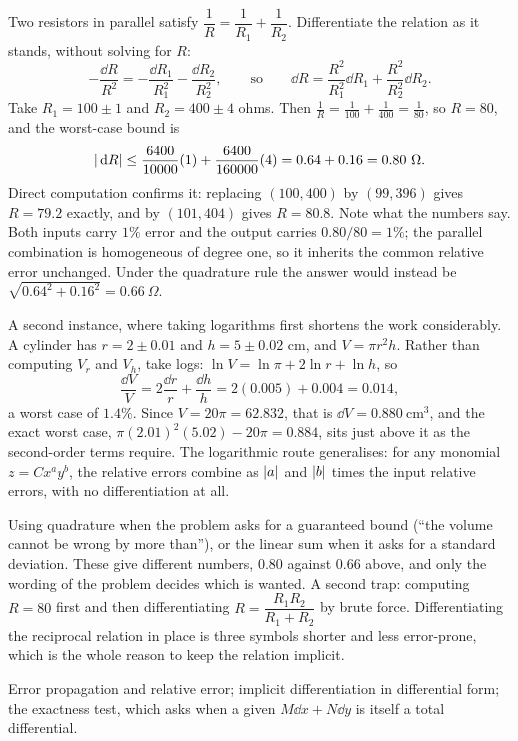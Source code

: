 \begin{worked}
Two resistors in parallel satisfy $\dfrac1R=\dfrac1{R_1}+\dfrac1{R_2}$. Differentiate the relation as it stands, without solving for $R$:
\[-\frac{\dd R}{R^{2}}=-\frac{\dd R_1}{R_1^{2}}-\frac{\dd R_2}{R_2^{2}},\qquad\text{so}\qquad \dd R=\frac{R^{2}}{R_1^{2}}\dd R_1+\frac{R^{2}}{R_2^{2}}\dd R_2.\]
Take $R_1=100\pm1$ and $R_2=400\pm4$ ohms. Then $\tfrac1R=\tfrac{1}{100}+\tfrac{1}{400}=\tfrac{1}{80}$, so $R=80$, and the worst-case bound is
\[\abs{\dd R}\leq\frac{6400}{10000}(1)+\frac{6400}{160000}(4)=0.64+0.16=0.80\ \Omega.\]
Direct computation confirms it: replacing $(100,400)$ by $(99,396)$ gives $R=79.2$ exactly, and by $(101,404)$ gives $R=80.8$. Note what the numbers say. Both inputs carry $1\%$ error and the output carries $0.80/80=1\%$; the parallel combination is homogeneous of degree one, so it inherits the common relative error unchanged. Under the quadrature rule the answer would instead be $\sqrt{0.64^{2}+0.16^{2}}=0.66\ \Omega$.

A second instance, where taking logarithms first shortens the work considerably. A cylinder has $r=2\pm0.01$ and $h=5\pm0.02$ cm, and $V=\pi r^{2}h$. Rather than computing $V_r$ and $V_h$, take logs: $\ln V=\ln\pi+2\ln r+\ln h$, so
\[\frac{\dd V}{V}=2\frac{\dd r}{r}+\frac{\dd h}{h}=2(0.005)+0.004=0.014,\]
a worst case of $1.4\%$. Since $V=20\pi=62.832$, that is $\dd V=0.880\ \mathrm{cm}^{3}$, and the exact worst case, $\pi(2.01)^{2}(5.02)-20\pi=0.884$, sits just above it as the second-order terms require. The logarithmic route generalises: for any monomial $z=Cx^{a}y^{b}$, the relative errors combine as $\left\lvert a\right\rvert$ and $\left\lvert b\right\rvert$ times the input relative errors, with no differentiation at all.
\end{worked}

\begin{trap}
Using quadrature when the problem asks for a guaranteed bound (``the volume cannot be wrong by more than''), or the linear sum when it asks for a standard deviation. These give different numbers, $0.80$ against $0.66$ above, and only the wording of the problem decides which is wanted. A second trap: computing $R=80$ first and then differentiating $R=\dfrac{R_1R_2}{R_1+R_2}$ by brute force. Differentiating the reciprocal relation in place is three symbols shorter and less error-prone, which is the whole reason to keep the relation implicit.
\end{trap}

\begin{seealsob}Error propagation and relative error; implicit differentiation in differential form; the exactness test, which asks when a given $M\dd x+N\dd y$ is itself a total differential.\end{seealsob}

